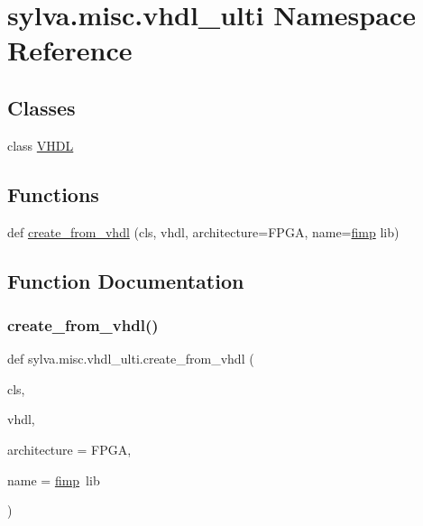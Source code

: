 \hypertarget{namespacesylva_1_1misc_1_1vhdl__ulti}{}\section{sylva.\+misc.\+vhdl\+\_\+ulti Namespace Reference}
\label{namespacesylva_1_1misc_1_1vhdl__ulti}
\subsection*{Classes}
\begin{DoxyCompactItemize}
\item 
class \hyperlink{classsylva_1_1misc_1_1vhdl__ulti_1_1_v_h_d_l}{V\+H\+DL}
\end{DoxyCompactItemize}
\subsection*{Functions}
\begin{DoxyCompactItemize}
\item 
def \hyperlink{namespacesylva_1_1misc_1_1vhdl__ulti_aeb869044a3abdaed35a68feec0f779fa}{create\+\_\+from\+\_\+vhdl} (cls, vhdl, architecture=\textquotesingle{}F\+P\+GA\textquotesingle{}, name=\textquotesingle{}\hyperlink{classsylva_1_1base_1_1fimp_1_1fimp}{fimp} lib\textquotesingle{})
\end{DoxyCompactItemize}


\subsection{Function Documentation}
\mbox{\label{namespacesylva_1_1misc_1_1vhdl__ulti_aeb869044a3abdaed35a68feec0f779fa}} 
\subsubsection{\texorpdfstring{create\+\_\+from\+\_\+vhdl()}{create\_from\_vhdl()}}
{\footnotesize\ttfamily def sylva.\+misc.\+vhdl\+\_\+ulti.\+create\+\_\+from\+\_\+vhdl (\begin{DoxyParamCaption}\item[{}]{cls,  }\item[{}]{vhdl,  }\item[{}]{architecture = {\ttfamily \textquotesingle{}FPGA\textquotesingle{}},  }\item[{}]{name = {\ttfamily \textquotesingle{}\hyperlink{classsylva_1_1base_1_1fimp_1_1fimp}{fimp}~lib\textquotesingle{}} }\end{DoxyParamCaption})}




